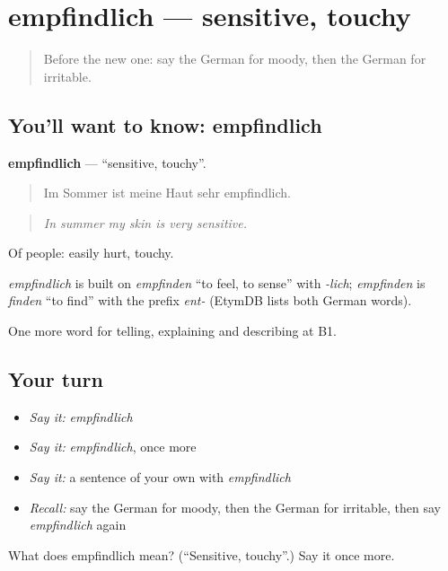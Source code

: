 \section[empfindlich]{empfindlich — sensitive, touchy}

\label{lesson:GE-C476-empfindlich}



\begin{quote}
Before the new one: say the German for moody, then the German for irritable.
\end{quote}

\subsection*{You'll want to know: empfindlich}
\textbf{empfindlich} — \textquotedblleft{}sensitive, touchy\textquotedblright{}.

\begin{quote}
Im Sommer ist meine Haut sehr empfindlich.
\end{quote}

\begin{quote}
\emph{In summer my skin is very sensitive.}
\end{quote}

Of people: easily hurt, touchy.

\begin{cousinweb}
\emph{empfindlich} is built on \emph{empfinden} \textquotedblleft{}to feel, to sense\textquotedblright{} with \emph{-lich}; \emph{empfinden} is \emph{finden} \textquotedblleft{}to find\textquotedblright{} with the prefix \emph{ent-} (EtymDB lists both German words).
\end{cousinweb}

\begin{grammarlens}[title={What you've built}]
One more word for telling, explaining and describing at B1.
\end{grammarlens}

\subsection*{Your turn}
\begin{itemize}
\raggedright
  \item \emph{Say it:} \emph{empfindlich}
  \item \emph{Say it:} \emph{empfindlich}, once more
  \item \emph{Say it:} a sentence of your own with \emph{empfindlich}
  \item \emph{Recall:} say the German for moody, then the German for irritable, then say \emph{empfindlich} again
\end{itemize}

\begin{tcolorbox}[breakable,colback=teal!4,colframe=teal!35!black,title={Before you move on}]
What does empfindlich mean? (\textquotedblleft{}Sensitive, touchy\textquotedblright{}.) Say it once more.
\end{tcolorbox}
